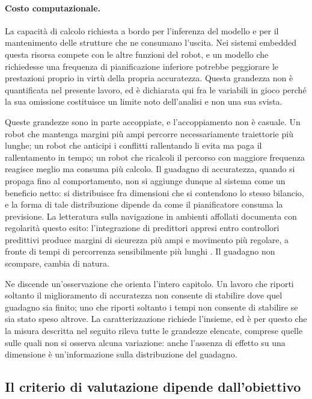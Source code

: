 \paragraph{Costo computazionale.} La capacità di calcolo richiesta a bordo per l'inferenza
del modello e per il mantenimento delle strutture che ne consumano l'uscita. Nei sistemi
embedded questa risorsa compete con le altre funzioni del robot, e un modello che
richiedesse una frequenza di pianificazione inferiore potrebbe peggiorare le prestazioni
proprio in virtù della propria accuratezza. Questa grandezza non è quantificata nel
presente lavoro, ed è dichiarata qui fra le variabili in gioco perché la sua omissione
costituisce un limite noto dell'analisi e non una sua svista.

\bigskip

Queste grandezze sono in parte accoppiate, e l'accoppiamento non è casuale. Un robot che
mantenga margini più ampi percorre necessariamente traiettorie più lunghe; un robot che
anticipi i conflitti rallentando li evita ma paga il rallentamento in tempo; un robot che
ricalcoli il percorso con maggiore frequenza reagisce meglio ma consuma più calcolo. Il
guadagno di accuratezza, quando si propaga fino al comportamento, non si aggiunge dunque
al sistema come un beneficio netto: si distribuisce fra dimensioni che si contendono lo
stesso bilancio, e la forma di tale distribuzione dipende da come il pianificatore consuma
la previsione. La letteratura sulla navigazione in ambienti affollati documenta con
regolarità questo esito: l'integrazione di predittori appresi entro controllori predittivi
produce margini di sicurezza più ampi e movimento più regolare, a fronte di tempi di
percorrenza sensibilmente più lunghi \cite{aslam2025mpc}. Il guadagno non scompare, cambia
di natura.

Ne discende un'osservazione che orienta l'intero capitolo. Un lavoro che riporti soltanto
il miglioramento di accuratezza non consente di stabilire dove quel guadagno sia finito;
uno che riporti soltanto i tempi non consente di stabilire se sia stato speso altrove. La
caratterizzazione richiede l'insieme, ed è per questo che la misura descritta nel seguito
rileva tutte le grandezze elencate, comprese quelle sulle quali non si osserva alcuna
variazione: anche l'assenza di effetto su una dimensione è un'informazione sulla
distribuzione del guadagno.


\subsection{Il criterio di valutazione dipende dall'obiettivo}

